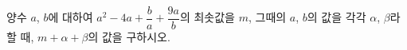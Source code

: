 양수 $a$, $b$에 대하여 $a^2-4a+\dfrac{b}{a}+\dfrac{9a}{b}$의 최솟값을 $m$, 그때의 $a$, $b$의 값을 각각 $\alpha$, $\beta$라 할 때, $m+\alpha+\beta$의 값을 구하시오.
